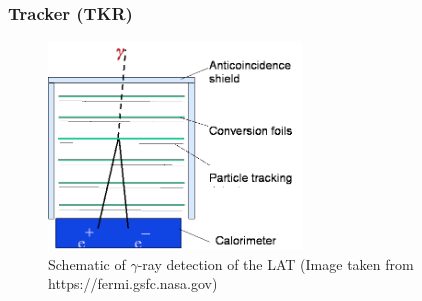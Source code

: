 



\subsubsection{Tracker (TKR)}

\begin{figure}[h!]
    \centering
    \includegraphics[width=0.6\textwidth]{content/background/figures/LAT_layers.png}
    \caption{
        Schematic of $\gamma$-ray detection of the LAT
        (Image taken from https://fermi.gsfc.nasa.gov)
    }
    \label{fig:fermi_lat_layers}
\end{figure}



